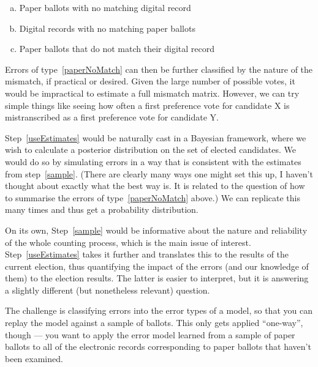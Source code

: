 \documentclass[10pt,a4paper]{article}
\begin{document}
\begin{enumerate}[(a)]
    \item Paper ballots with no matching digital record
    \item Digital records with no matching paper ballots
    \item Paper ballots that do not match their digital record \label{paperNoMatch}
\end{enumerate}

    Errors of type~\ref{paperNoMatch}  can then be further classified by the nature of the mismatch, if practical or desired.  Given the large number of possible votes, it would be impractical to estimate a full mismatch matrix.  However, we can try simple things like seeing how often a first preference vote for candidate X is mistranscribed as a first preference vote for candidate Y.

    Step~\ref{useEstimates}  would be naturally cast in a Bayesian framework, where we wish to calculate a posterior distribution on the set of elected candidates.  We would do so by simulating errors in a way that is consistent with the estimates from step~\ref{sample}.  (There are clearly many ways one might set this up, I haven't thought about exactly what the best way is.  It is related to the question of how to summarise the errors of type~\ref{paperNoMatch}  above.)  We can replicate this many times and thus get a probability distribution.

    On its own, Step~\ref{sample} would be informative about the nature and reliability of the whole counting process, which is the main issue of interest.  Step~\ref{useEstimates} takes it further and translates this to the results of the current election, thus quantifying the impact of the errors (and our knowledge of them) to the election results.  The latter is easier to interpret, but it is answering a slightly different (but nonetheless relevant) question.


The challenge is classifying errors into the
error types of a model, so that you can replay the model
against a sample of ballots.   This only gets applied
``one-way'', though --- you want to apply the error model
learned from a sample of paper ballots to all of the electronic
records corresponding to paper ballots that haven't been
examined.



\end{document}
